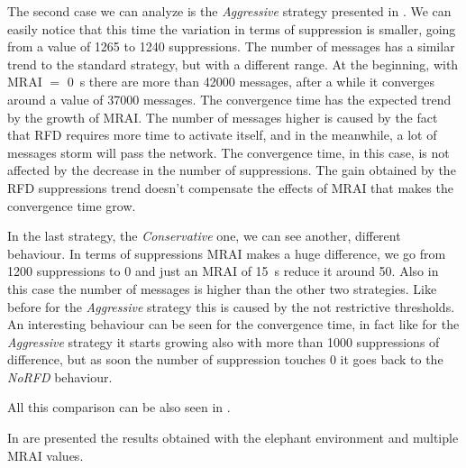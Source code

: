 The second case we can analyze is the \textit{Aggressive} strategy presented
in .
We can easily notice that this time the variation in terms of suppression is smaller,
going from a value of \num{1265} to \num{1240} suppressions.
The number of messages has a similar trend to the standard strategy, but with
a different range.
At the beginning, with \ac{MRAI} $=$ \SI{0}{\second} there are more than \num{42000}
messages, after a while it converges around a value of \num{37000} messages.
The convergence time has the expected trend by the growth of \ac{MRAI}.
The number of messages higher is caused by the fact that \ac{RFD} requires more time
to activate itself, and in the meanwhile, a lot of messages storm will pass the
network.
The convergence time, in this case, is not affected by the decrease in the number
of suppressions.
The gain obtained by the \ac{RFD} suppressions trend doesn't compensate the
effects of \ac{MRAI} that makes the convergence time grow.

In the last strategy, the \textit{Conservative} one, we can see another, different
behaviour.
In terms of suppressions \ac{MRAI} makes a huge difference, we go from \num{1200}
suppressions to \num{0} and just an \ac{MRAI} of \SI{15}{\second} reduce it around
\num{50}.
Also in this case the number of messages is higher than the other two strategies.
Like before for the \textit{Aggressive} strategy this is caused by the not
restrictive thresholds.
An interesting behaviour can be seen for the convergence time, in fact like for
the \textit{Aggressive} strategy it starts growing also with more than \num{1000}
suppressions of difference, but as soon the number of suppression touches \num{0}
it goes back to the \textit{NoRFD} behaviour.

All this comparison can be also seen in .

In  are presented the results obtained
with the elephant environment and multiple \ac{MRAI} values.

